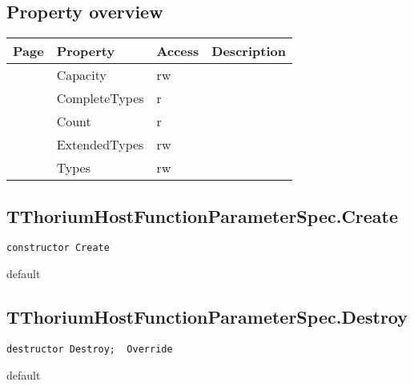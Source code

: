 \subsection{Property overview}
\label{thoriumcore:thorium:tthoriumhostfunctionparameterspec:properties}
\begin{tabularx}{\textwidth}{lllX}
Page & Property & Access & Description \\ \hline
\pageref{thoriumcore:thorium:tthoriumhostfunctionparameterspec:capacity} & Capacity & rw &  \\
\pageref{thoriumcore:thorium:tthoriumhostfunctionparameterspec:completetypes} & CompleteTypes & r &  \\
\pageref{thoriumcore:thorium:tthoriumhostfunctionparameterspec:count} & Count & r &  \\
\pageref{thoriumcore:thorium:tthoriumhostfunctionparameterspec:extendedtypes} & ExtendedTypes & rw &  \\
\pageref{thoriumcore:thorium:tthoriumhostfunctionparameterspec:types} & Types & rw &  \\
\hline
\end{tabularx}
\subsection{TThoriumHostFunctionParameterSpec.Create}
\label{thoriumcore:thorium:tthoriumhostfunctionparameterspec:create}
\begin{FPCList}
\Synopsis
\Declaration 

\begin{verbatim}
constructor Create
\end{verbatim}
\Visibility
default
\Description
\Errors
\end{FPCList}
\subsection{TThoriumHostFunctionParameterSpec.Destroy}
\label{thoriumcore:thorium:tthoriumhostfunctionparameterspec:destroy}
\begin{FPCList}
\Synopsis
\Declaration 

\begin{verbatim}
destructor Destroy;  Override
\end{verbatim}
\Visibility
default
\Description
\Errors
\end{FPCList}
